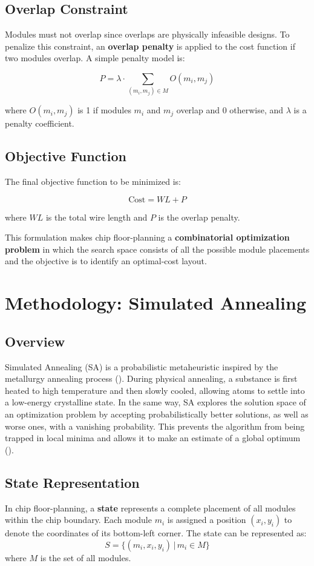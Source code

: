\documentclass[9pt,a4paper,twoside]{rho-class/rho}
\begin{document}
\subsection{Overlap Constraint}
Modules must not overlap since overlaps are physically infeasible designs. To penalize this constraint, an  \textbf{overlap penalty} is applied to the cost function if two modules overlap. A simple penalty model is: 

\[
P = \lambda \cdot \sum_{(m_i, m_j) \in M} O(m_i, m_j)
\]

where $O(m_i, m_j)$ is 1 if modules $m_i$ and $m_j$ overlap and 0 otherwise, and $\lambda$ is a penalty coefficient.  

\subsection{Objective Function}
The final objective function to be minimized is:  

\[
\text{Cost} = WL + P
\]

where $WL$ is the total wire length and $P$ is the overlap penalty.  

This formulation makes chip floor-planning a  \textbf{combinatorial optimization problem} in which the search space consists of all the possible module placements and the objective is to identify an optimal-cost layout. 

\section{Methodology: Simulated Annealing}

\subsection{Overview}
Simulated Annealing (SA) is a probabilistic metaheuristic inspired by the metallurgy annealing process   (\cite{kirkpatrick1983}). During physical annealing, a substance is first heated to high temperature and then slowly cooled, allowing atoms to settle into a low-energy crystalline state. In the same way, SA explores the solution space of an optimization problem by accepting probabilistically better solutions, as well as worse ones, with a vanishing probability. This prevents the algorithm from being trapped in local minima and allows it to make an estimate of a global optimum  (\cite{chen2011,fang2009}).

\subsection{State Representation}
In chip floor-planning, a \textbf{state} represents a complete placement of all modules within the chip boundary. Each module $m_i$ is assigned a position $(x_i, y_i)$ to denote the coordinates of its bottom-left corner. The state can be represented as:
\[
S = \{ (m_i, x_i, y_i) \,|\, m_i \in M \}
\]
where $M$ is the set of all modules.
\end{document}
